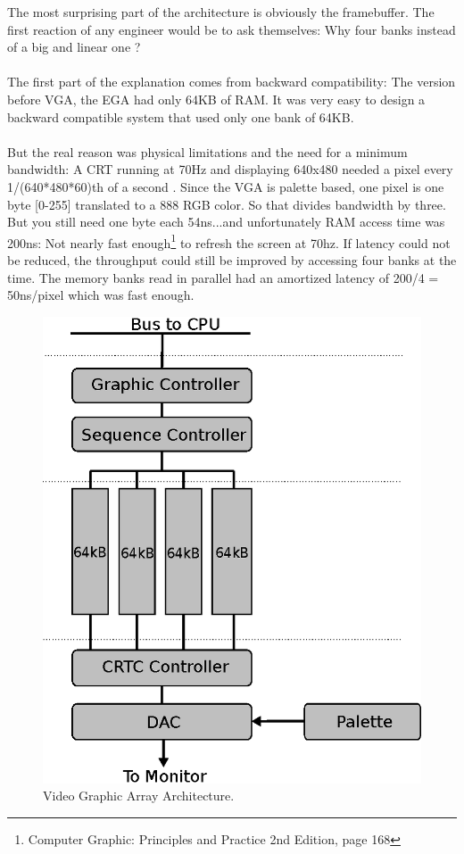 \documentclass[book.tex]{subfiles}
\begin{document}
The most surprising part of the architecture is obviously the framebuffer. The first reaction of any engineer would be to ask themselves: Why four banks instead of a big and linear one ?\\
\\
The first part of the explanation comes from backward compatibility: The version before VGA, the EGA had only 64KB of RAM. It was very easy to design a backward compatible system that used only one bank of 64KB.\\
\\
But the real reason was physical limitations and the need for a minimum bandwidth: A CRT running at 70Hz and displaying 640x480 needed a pixel every 1/(640*480*60)th of a second . Since the VGA is palette based, one pixel is one byte [0-255] translated to a 888 RGB color. So that divides bandwidth by three. But you still need one byte each 54ns...and unfortunately RAM access time was 200ns: Not nearly fast enough\footnote{Computer Graphic: Principles and Practice 2nd Edition, page 168} to refresh the screen at 70hz. If latency could not be reduced, the throughput could still be improved by accessing four banks at the time. The memory banks read in parallel had an amortized latency of 200/4 = 50ns/pixel which was fast enough.


\begin{figure}[H]
\centering
\includegraphics[width=\textwidth]{imgs/vga.eps}
\caption{Video Graphic Array Architecture.}
\label{fig:vga_arch}
\end{figure}
\end{document}
